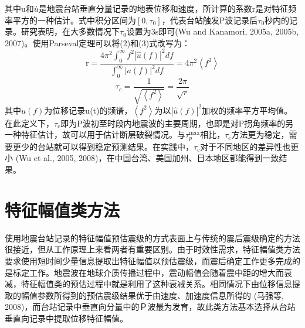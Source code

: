 其中u和$\dot{u}$̇是地震台站垂直分量记录的地表位移和速度，所计算的系数r是对特征频率平方的一种估计。式中积分区间为$\left[0, \tau_{0}\right]$，代表台站触发P波记录后$\tau_{0}$秒内的记录。研究表明，在大多数情况下$\tau_{0}$设置为3s即可(Wu and Kanamori, 2005a, 2005b, 2007)。使用Parseval定理可以将(2)和(3)式改写为：
\begin{equation}
\mathrm{r}=\frac{4 \pi^{2} \int_{0}^{\infty} f^{2}|\widehat{u}(f)|^{2} d f}{\int_{0}^{\infty}|a(f)|^{2} d f}=4 \pi^{2}\left\langle f^{2}\right\rangle
\end{equation}
\begin{equation}
\tau_{c}=\frac{1}{\sqrt{\left\langle f^{2}\right\rangle}}=\frac{2 \pi}{\sqrt{r}}
\end{equation}
其中$\widehat{u}(f)$为位移记录u(t)的频谱，$\left\langle f^{2}\right\rangle$为以$|\hat{u}(f)|^{2}$加权的频率平方平均值。在此定义下，$\tau_{\mathrm{c}}$即为P波初至时段内地震波的主要周期，也即是对P拐角频率的另一种特征估计，故可以用于估计断层破裂情况。与$\tau_{p}^{\max}$相比，$\tau_{\mathrm{c}}$方法更为稳定，需要更少的台站就可以得到稳定预测结果。在实践中，$\tau_{\mathrm{c}}$对于不同地区的差异性也更小 (Wu et al., 2005, 2008)，在中国台湾、美国加州、日本地区都能得到一致结果。

\section{特征幅值类方法}

 \indent 使用地震台站记录的特征幅值预估震级的方式表面上与传统的震后震级确定的方法很接近，但从工作原理上来看两者有重要区别。由于时效性需求，特征幅值类方法要求使用短时间少量信息提取出特征幅值以预估震级，而震后确定工作更多完成的是标定工作。地震波在地球介质传播过程中，震动幅值会随着震中距的增大而衰减，特征幅值类的预估过程中就是利用了这种衰减关系。相同情况下由位移信息提取的幅值参数所得到的预估震级结果优于由速度、加速度信息所得的 (马强等, 2008)，而台站记录中垂直向分量中的Ｐ波最为发育，故此类方法基本选择从台站垂直向记录中提取位移特征幅值。
 
